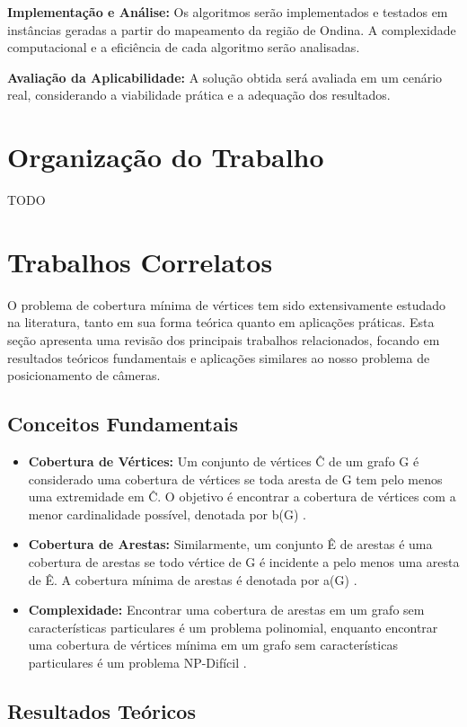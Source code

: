 \documentclass[12pt, a4paper]{report}
\begin{document}
\textbf{Implementação e Análise:} Os algoritmos serão implementados e testados em instâncias geradas a partir do mapeamento da região de Ondina. A complexidade computacional e a eficiência de cada algoritmo serão analisadas.

\textbf{Avaliação da Aplicabilidade:} A solução obtida será avaliada em um cenário real, considerando a viabilidade prática e a adequação dos resultados.


\section{Organização do Trabalho}
TODO

\section{Trabalhos Correlatos}
O problema de cobertura mínima de vértices tem sido extensivamente estudado na literatura, tanto em sua forma teórica quanto em aplicações práticas. Esta seção apresenta uma revisão dos principais trabalhos relacionados, focando em resultados teóricos fundamentais e aplicações similares ao nosso problema de posicionamento de câmeras.
\subsection*{Conceitos Fundamentais}
\begin{itemize} 
  \item \textbf{Cobertura de Vértices:} Um conjunto de vértices Ĉ de um grafo G é considerado uma cobertura de vértices se toda aresta de G tem pelo menos uma extremidade em Ĉ. O objetivo é encontrar a cobertura de vértices com a menor cardinalidade possível, denotada por b(G) \cite{goldbarg2012}. 
  \item \textbf{Cobertura de Arestas:} Similarmente, um conjunto Ê de arestas é uma cobertura de arestas se todo vértice de G é incidente a pelo menos uma aresta de Ê. A cobertura mínima de arestas é denotada por a(G) \cite{goldbarg2012}. 
  \item \textbf{Complexidade:} Encontrar uma cobertura de arestas em um grafo sem características particulares é um problema polinomial, enquanto encontrar uma cobertura de vértices mínima em um grafo sem características particulares é um problema NP-Difícil \cite{goldbarg2012}. 
\end{itemize}
\subsection*{Resultados Teóricos} 
\end{document}
